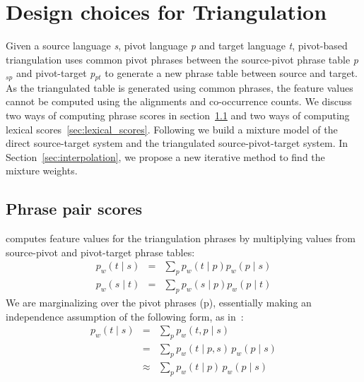 \documentclass[11pt]{article}
\begin{document}
\section{Design choices for Triangulation}
\label{sec:models}
	
	Given a source language \emph{s}, pivot language \emph{p} and target language \emph{t}, pivot-based triangulation uses common pivot phrases between the source-pivot phrase table \emph{p$_{sp}$} and pivot-target \emph{p$_{pt}$} to generate a new phrase table between source and target. As the triangulated table is generated using common phrases, the feature values cannot be computed using the alignments and co-occurrence counts. We discuss two ways of computing phrase scores in section~\ref{sec:phrase_scores} and two ways of computing lexical scores~\ref{sec:lexical_scores}. Following \cite{Cohn:07} we build a mixture model of the direct source-target system and the triangulated source-pivot-target system. In Section~\ref{sec:interpolation}, we propose a new iterative method to find the mixture weights.

\subsection{Phrase pair scores}
\label{sec:phrase_scores}

 \cite{Utiyama:07} computes feature values for the triangulation phrases by multiplying values from source-pivot and pivot-target phrase tables:
	\begin{eqnarray} 
	    \label{eq:forward}
        p_w(t \mid s) &=& \sum_{p} p_w(t \mid p) p_w(p \mid s) \\
        \label{eq:backward}
        p_w(s \mid t) &=& \sum_{p} p_w(s \mid p) p_w(p \mid t)
	\end{eqnarray}
	We are marginalizing over the pivot phrases (p), essentially making an independence assumption of the following form, as in~\cite{Cohn:07}:  
	\begin{eqnarray*}
		p_w(t \mid s)&=&\sum_{p}{p_w(t, p \mid s)}\\
		&=& \sum_{p}{p_w(t \mid p, s)\,p_w(p \mid s)}\\
		&\approx& \sum_{p}{p_w(t \mid p)\,p_w(p \mid s)}
	\end{eqnarray*}
\end{document}
